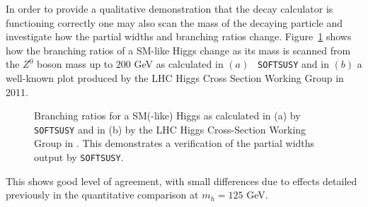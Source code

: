 \documentclass[final,3p,times,pdflatex]{elsarticle}
\begin{document}
In order to provide a qualitative demonstration that the decay calculator is
functioning correctly one may also scan the mass of the decaying particle and
investigate how the partial widths and branching ratios change. 
Figure~\ref{h0scancomp} shows how the branching ratios of a SM-like Higgs
change as its 
mass is scanned from the $Z^0$ boson mass up to $200$ GeV as calculated in
$(a)$ {\tt 
  SOFTSUSY} and in $(b)$ a well-known plot produced by the LHC Higgs Cross
Section Working Group \cite{Denner:2011} in 2011. 
\begin{figure}
  \centering
  \hfill
  \caption{Branching ratios for a SM(-like) Higgs as calculated in (a) by {\tt SOFTSUSY} and in (b) by the LHC Higgs Cross-Section Working Group in \cite{Denner:2011}. This demonstrates a verification of the partial widths output by {\tt SOFTSUSY}.} \label{h0scancomp}
\end{figure} 
This shows good level of agreement, with small differences due to effects
detailed previously in the quantitative comparison at $m_h = 125$ GeV. 
\end{document}
